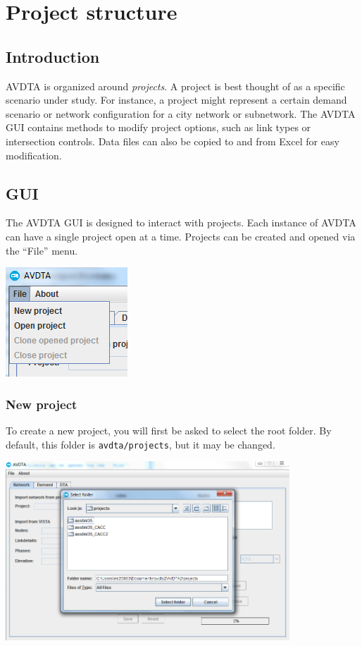 \chapter{Project structure}


\section{Introduction}

AVDTA is organized around \textit{projects}. A project is best thought of as a specific scenario under study. For instance, a project might represent a certain demand scenario or network configuration for a city network or subnetwork. The AVDTA GUI contains methods to modify project options, such as link types or intersection controls. Data files can also be copied to and from Excel for easy modification.

\section{GUI}

The AVDTA GUI is designed to interact with projects. Each instance of AVDTA can have a single project open at a time. Projects can be created and opened via the ``File'' menu.

\begin{center}
\includegraphics[scale=1]{images/project1.png}
\end{center}


\subsection{New project}
\label{sec:newproject}
To create a new project, you will first be asked to select the root folder. By default, this folder is \texttt{avdta/projects}, but it may be changed.

\begin{center}
\includegraphics[width=0.8\textwidth]{images/project2.png}
\end{center}

